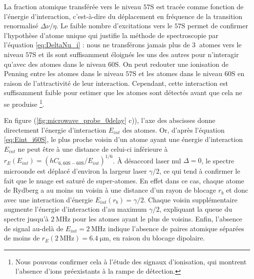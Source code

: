 %
La fraction atomique transférée vers le niveau $\mathrm{57S}$ est tracée comme fonction de l'énergie d'interaction, c'est-à-dire du déplacement en fréquence de la transition renormalisé $\Delta\nu/\eta$.
Le faible nombre d'excitations vers le $\mathrm{57S}$ permet de confirmer l'hypothèse d'atome unique qui justifie la méthode de spectroscopie par l'équation \eqref{eq:DeltaNu_i} : nous ne transférons jamais plus de $\SI{3}{}$ atomes vers le niveau $\mathrm{57S}$ et ils sont suffisamment éloignés les uns des autres pour n'interagir qu'avec des atomes dans le niveau $\mathrm{60S}$.
On peut redouter une ionisation de Penning entre les atomes dans le niveau $\mathrm{57S}$ et les atomes dans le niveau $\mathrm{60S}$ en raison de l'attractivité de leur interaction.
Cependant, cette interaction est suffisamment faible pour estimer que les atomes sont détectés avant que cela ne se produise \footnote{
Nous pouvons confirmer cela à l'étude des signaux d'ionisation, qui montrent l'absence d'ions préexistants à la rampe de détection.}.

En figure (\ref{fig:microwave_probe_0delay} c)), l'axe des abscisses donne directement l'énergie d'interaction $E_{int}$ des atomes.
Or, d'après l'équation \eqref{eq:Eint_i60S}, le plus proche voisin d'un atome ayant une énergie d'interaction $E_{int}$ ne peut être à une distance de celui-ci inférieure à $r_E(E_{int}) = (hC_{6,\mathrm{60S-60S}}/E_{int})^{1/6}$.
\`A désaccord laser nul $\Delta = 0$, le spectre microonde est déplacé d'environ la largeur laser $\gamma/2$, ce qui tend à confirmer le fait que le nuage est saturé de super-atomes.
En effet dans ce cas, chaque atome de Rydberg a au moins un voisin à une distance d'un rayon de blocage $r_b$ et donc avec une interaction d'énergie $E_{int}(r_b) = \gamma/2$.
Chaque voisin supplémentaire augmente l'énergie d'interaction d'au maximum $\gamma/2$, expliquant la queue du spectre jusqu'à $\SI{2}{\MHz}$ pour les atomes ayant le plus de voisins.
Enfin, l'absence de signal au-delà de $E_{int} = \SI{2}{\MHz}$ indique l'absence de paires atomique séparées de moins de $r_E(\SI{2}{\MHz}) = \SI{6.4}{\um}$, en raison du blocage dipolaire.
	
